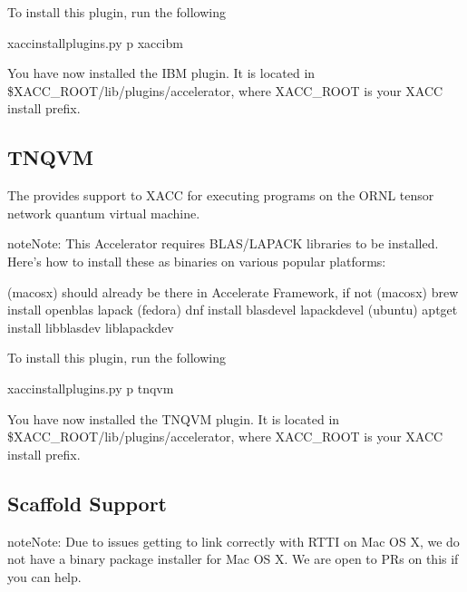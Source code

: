 \documentclass[letterpaper,10pt,english]{sphinxmanual}
\begin{document}
To install this plugin, run the following

\begin{sphinxVerbatim}[commandchars=\\\{\}]
\PYGZdl{} xacc\PYGZhy{}install\PYGZhy{}plugins.py \PYGZhy{}p xacc\PYGZhy{}ibm
\end{sphinxVerbatim}

You have now installed the IBM plugin. It is located in \$XACC\_ROOT/lib/plugins/accelerator,
where XACC\_ROOT is your XACC install prefix.


\subsection{TNQVM}
\label{\detokenize{install:tnqvm}}
The  provides
support to XACC for executing programs
on the ORNL tensor network quantum virtual machine.

\begin{sphinxadmonition}{note}{Note:}
This Accelerator requires BLAS/LAPACK libraries to be installed.
Here’s how to install these as binaries on various popular platforms:

\begin{sphinxVerbatim}[commandchars=\\\{\}]
\PYGZdl{} (macosx) should already be there in Accelerate Framework, if not
\PYGZdl{} (macosx) brew install openblas lapack
\PYGZdl{} (fedora) dnf install blas\PYGZhy{}devel lapack\PYGZhy{}devel
\PYGZdl{} (ubuntu) apt\PYGZhy{}get install libblas\PYGZhy{}dev liblapack\PYGZhy{}dev
\end{sphinxVerbatim}
\end{sphinxadmonition}

To install this plugin, run the following

\begin{sphinxVerbatim}[commandchars=\\\{\}]
\PYGZdl{} xacc\PYGZhy{}install\PYGZhy{}plugins.py \PYGZhy{}p tnqvm
\end{sphinxVerbatim}

You have now installed the TNQVM plugin. It is located in \$XACC\_ROOT/lib/plugins/accelerator,
where XACC\_ROOT is your XACC install prefix.


\subsection{Scaffold Support}
\label{\detokenize{install:scaffold-support}}
\begin{sphinxadmonition}{note}{Note:}
Due to issues getting  to link correctly with RTTI on Mac OS X, we do not have a binary package installer for Mac OS X. We are open to PRs on this if you can help.
\end{sphinxadmonition}
\end{document}
